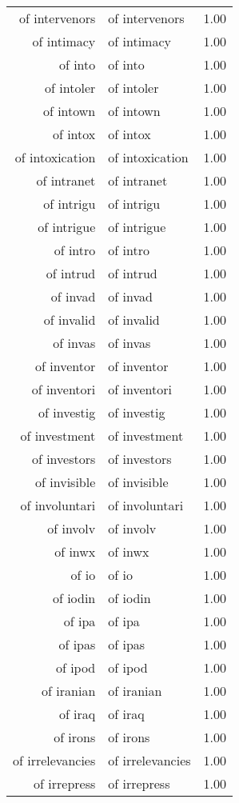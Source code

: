 \begin{table}[ht]
\begin{tabular}{rlr}
  of intervenors & of intervenors & 1.00 \\ 
  of intimacy & of intimacy & 1.00 \\ 
  of into & of into & 1.00 \\ 
  of intoler & of intoler & 1.00 \\ 
  of intown & of intown & 1.00 \\ 
  of intox & of intox & 1.00 \\ 
  of intoxication & of intoxication & 1.00 \\ 
  of intranet & of intranet & 1.00 \\ 
  of intrigu & of intrigu & 1.00 \\ 
  of intrigue & of intrigue & 1.00 \\ 
  of intro & of intro & 1.00 \\ 
  of intrud & of intrud & 1.00 \\ 
  of invad & of invad & 1.00 \\ 
  of invalid & of invalid & 1.00 \\ 
  of invas & of invas & 1.00 \\ 
  of inventor & of inventor & 1.00 \\ 
  of inventori & of inventori & 1.00 \\ 
  of investig & of investig & 1.00 \\ 
  of investment & of investment & 1.00 \\ 
  of investors & of investors & 1.00 \\ 
  of invisible & of invisible & 1.00 \\ 
  of involuntari & of involuntari & 1.00 \\ 
  of involv & of involv & 1.00 \\ 
  of inwx & of inwx & 1.00 \\ 
  of io & of io & 1.00 \\ 
  of iodin & of iodin & 1.00 \\ 
  of ipa & of ipa & 1.00 \\ 
  of ipas & of ipas & 1.00 \\ 
  of ipod & of ipod & 1.00 \\ 
  of iranian & of iranian & 1.00 \\ 
  of iraq & of iraq & 1.00 \\ 
  of irons & of irons & 1.00 \\ 
  of irrelevancies & of irrelevancies & 1.00 \\ 
  of irrepress & of irrepress & 1.00 \\ 

\end{tabular}
\end{table}
